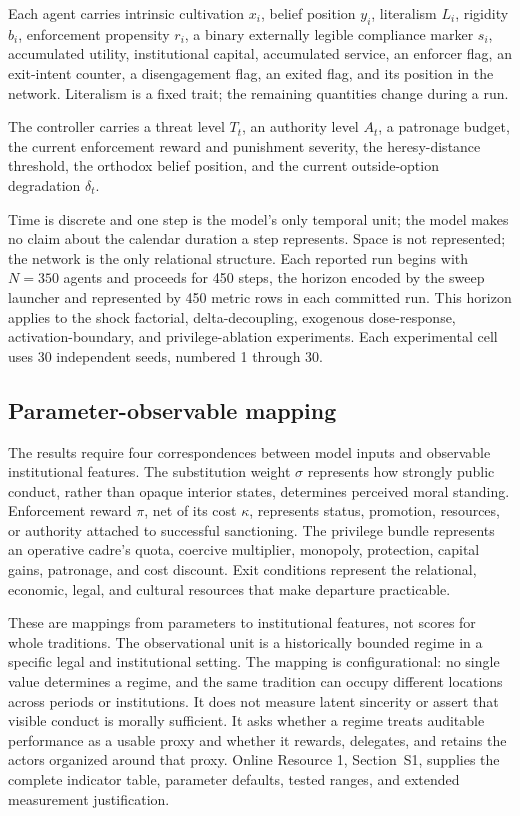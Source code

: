 \documentclass[12pt]{article}
\begin{document}
Each agent carries intrinsic cultivation \(x_i\), belief position \(y_i\),
literalism \(L_i\), rigidity \(b_i\), enforcement propensity \(r_i\), a binary
externally legible compliance marker \(s_i\), accumulated utility, institutional
capital, accumulated service, an enforcer flag, an exit-intent counter, a
disengagement flag, an exited flag, and its position in the network. Literalism
is a fixed trait; the remaining quantities change during a run.

The controller carries a threat level \(T_t\), an authority level \(A_t\), a
patronage budget, the current enforcement reward and punishment severity, the
heresy-distance threshold, the orthodox belief position, and the current
outside-option degradation \(\delta_t\).

Time is discrete and one step is the model's only temporal unit; the model
makes no claim about the calendar duration a step represents. Space is not
represented; the network is the only relational structure. Each reported run
begins with \(N=350\) agents and proceeds for 450 steps, the horizon encoded by
the sweep launcher and represented by 450 metric rows in each committed run.
This horizon applies to the shock factorial, delta-decoupling, exogenous
dose-response, activation-boundary, and privilege-ablation experiments. Each
experimental cell uses 30 independent seeds, numbered 1 through 30.

\subsection{Parameter-observable mapping}

The results require four correspondences between model inputs and observable
institutional features.
The substitution weight \(\sigma\) represents how strongly public conduct,
rather than opaque interior states, determines perceived moral standing.
Enforcement reward \(\pi\), net of its cost \(\kappa\), represents status,
promotion, resources, or authority attached to successful sanctioning.
The privilege bundle represents an operative cadre's quota, coercive
multiplier, monopoly, protection, capital gains, patronage, and cost discount.
Exit conditions represent the relational, economic, legal, and cultural
resources that make departure practicable.

These are mappings from parameters to institutional features, not scores for
whole traditions.
The observational unit is a historically bounded regime in a specific legal
and institutional setting.
The mapping is configurational: no single value determines a regime, and the
same tradition can occupy different locations across periods or institutions.
It does not measure latent sincerity or assert that visible conduct is morally
sufficient.
It asks whether a regime treats auditable performance as a usable proxy and
whether it rewards, delegates, and retains the actors organized around that
proxy.
Online Resource 1, Section~S1, supplies the complete indicator table, parameter
defaults, tested ranges, and extended measurement justification.
\end{document}
